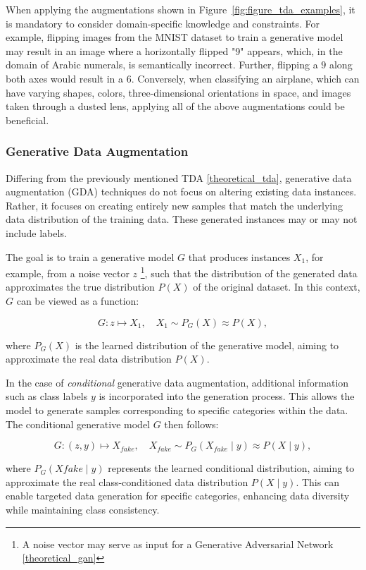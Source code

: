\noindent
When applying the augmentations shown in Figure~\ref{fig:figure_tda_examples}, it is mandatory to consider domain-specific knowledge and constraints. For example, flipping images from the MNIST dataset to train a generative model may result in an image where a horizontally flipped "9" appears, which, in the domain of Arabic numerals, is semantically incorrect. Further, flipping a $9$ along both axes would result in a $6$. Conversely, when classifying an airplane, which can have varying shapes, colors, three-dimensional orientations in space, and images taken through a dusted lens, applying all of the above augmentations could be beneficial.


\subsubsection[Generative Data Augmentation - GDA]{Generative Data Augmentation}\label{theoretical_gda}
Differing from the previously mentioned TDA \ref{theoretical_tda}, generative data augmentation (GDA) techniques do not focus on altering existing data instances. Rather, it focuses on creating entirely new samples that match the underlying data distribution of the training data. These generated instances may or may not include labels.

The goal is to train a generative model \( G \) that produces instances \( X_1 \), for example, from a noise vector \( z \) \footnote{A noise vector may serve as input for a Generative Adversarial Network \ref{theoretical_gan}}, such that the distribution of the generated data approximates the true distribution \( P(X) \) of the original dataset. In this context, \( G \) can be viewed as a function:

\[
G: z \mapsto X_1, \quad X_1 \sim P_G(X) \approx P(X),
\]

\noindent
where \( P_G(X) \) is the learned distribution of the generative model, aiming to approximate the real data distribution \( P(X) \).

In the case of \textit{conditional} generative data augmentation, additional information such as class labels \( y \) is incorporated into the generation process. This allows the model to generate samples corresponding to specific categories within the data. The conditional generative model \( G \) then follows:

\[
G: (z, y) \mapsto X_{fake}, \quad X_{fake} \sim P_G(X_{fake} \mid y) \approx P(X \mid y),
\]

\noindent
where \( P_G(X{fake} \mid y) \) represents the learned conditional distribution, aiming to approximate the real class-conditioned data distribution \( P(X \mid y) \). This can enable targeted data generation for specific categories, enhancing data diversity while maintaining class consistency.

